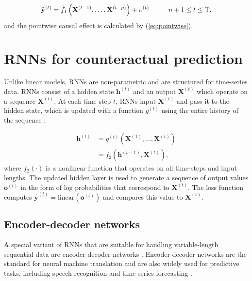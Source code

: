 \documentclass[hidelinks,12pt]{article}
\begin{document}
\begin{equation}\label{eq:ar-post}
\mathbf{\hat{y}}^{(t)} =  \hat{f_1} \left(\mathbf{X}^{(t-1)}, \ldots, \mathbf{X}^{(t-p)}\right) + \upsilon^{(t)} \hspace{10mm} n+1 \leq t \leq \text{T}, 
\end{equation}
\noindent 
and the pointwise causal effect is calculated by (\ref{eq:pointwise}).

\section{RNNs for counteractual prediction} \label{RNNs-section}

Unlike linear models, RNNs are non-parametric and are structured for time-series data. RNNs consist of a hidden state $\mathbf{h}^{(t)}$ and an output $\mathbf{X}^{(t)}$ which operate on a sequence $\mathbf{X}^{(t)}$. At each time-step $t$, RNNs input $\mathbf{X}^{(t)}$ and pass it to the hidden state, which is updated with a function $g^{(t)}$ using the entire history of the sequence \citep[pp. 337][]{goodfellow2016deep}:

\begin{align}
\mathbf{h}^{(t)} &= g^{(t)} \left(\mathbf{X}^{(1)}, \ldots, \mathbf{X}^{(t)} \right) \nonumber \\ 
&= f_2 \left( \mathbf{h}^{(t-1)}, \mathbf{X}^{(t)} \right), \label{eq:hidden}
\end{align} where $f_2(\cdot)$ is a nonlinear function that operates on all time-steps and input lengths. The updated hidden layer is used to generate a sequence of output values $\mathbf{o}^{(t)}$ in the form of log probabilities that correspond to $\mathbf{X}^{(t)}$. The loss function computes $\mathbf{\hat{y}}^{(t)} = \mathrm{linear} (\mathbf{o}^{(t)})$ and compares this value to $\mathbf{X}^{(t)}$.

\subsection{Encoder-decoder networks}

A special variant of RNNs that are suitable for handling variable-length sequential data are encoder-decoder networks \citep{cho2014learning}. Encoder-decoder networks are the standard for neural machine translation \citep{bahdanau2014neural,vinyals2014grammar} and are also widely used for predictive tasks, including speech recognition \citep{chorowski2015attention} and time-series forecasting \citep{zhu2017deep}. 
\end{document}
